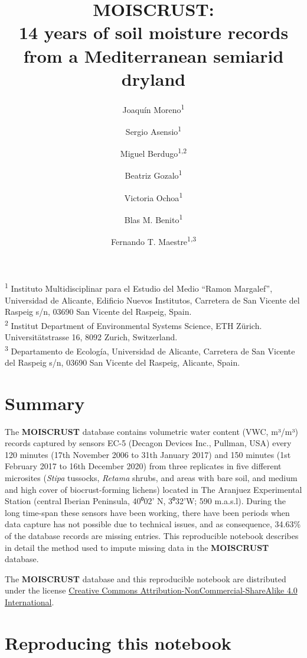 \documentclass[
  table]{article}
\title{MOISCRUST:\\
14 years of soil moisture records\\
from a Mediterranean semiarid dryland}
\author{Joaquín Moreno\textsuperscript{1} \and Sergio Asensio\textsuperscript{1} \and Miguel Berdugo\textsuperscript{1,2} \and Beatriz Gozalo\textsuperscript{1} \and Victoria Ochoa\textsuperscript{1} \and Blas M. Benito\textsuperscript{1} \and Fernando T. Maestre\textsuperscript{1,3}}
\date{}
\begin{document}
\maketitle

\renewcommand*\contentsname{Table of contents}
{
\hypersetup{linkcolor=}
\setcounter{tocdepth}{1}
\tableofcontents
}
\textsuperscript{1} Instituto Multidisciplinar para el Estudio del Medio
``Ramon Margalef'', Universidad de Alicante, Edificio Nuevos Institutos,
Carretera de San Vicente del Raspeig s/n, 03690 San Vicente del Raspeig,
Spain.\\
\textsuperscript{2} Institut Department of Environmental Systems
Science, ETH Zürich. Universitätstrasse 16, 8092 Zurich, Switzerland.\\
\textsuperscript{3} Departamento de Ecología, Universidad de Alicante,
Carretera de San Vicente del Raspeig s/n, 03690 San Vicente del Raspeig,
Alicante, Spain.

\newpage

\hypertarget{summary}{%
\section{Summary}\label{summary}}

The \textbf{MOISCRUST} database contains volumetric water content (VWC,
m³/m³) records captured by sensors EC-5 (Decagon Devices Inc., Pullman,
USA) every 120 minutes (17th November 2006 to 31th January 2017) and 150
minutes (1st February 2017 to 16th December 2020) from three replicates
in five different microsites (\emph{Stipa} tussocks, \emph{Retama}
shrubs, and areas with bare soil, and medium and high cover of
biocrust-forming lichens) located in The Aranjuez Experimental Station
(central Iberian Peninsula, 40⁰02' N, 3⁰32'W; 590 m.a.s.l). During the
long time-span these sensors have been working, there have been periods
when data capture has not possible due to technical issues, and as
consequence, 34.63\% of the database records are missing entries. This
reproducible notebook describes in detail the method used to impute
missing data in the \textbf{MOISCRUST} database.

The \textbf{MOISCRUST} database and this reproducible notebook are
distributed under the license
\href{https://creativecommons.org/licenses/by/4.0/legalcode}{Creative
Commons Attribution-NonCommercial-ShareAlike 4.0 International}.

\hypertarget{reproducing-this-notebook}{%
\section{Reproducing this notebook}\label{reproducing-this-notebook}}
\end{document}
